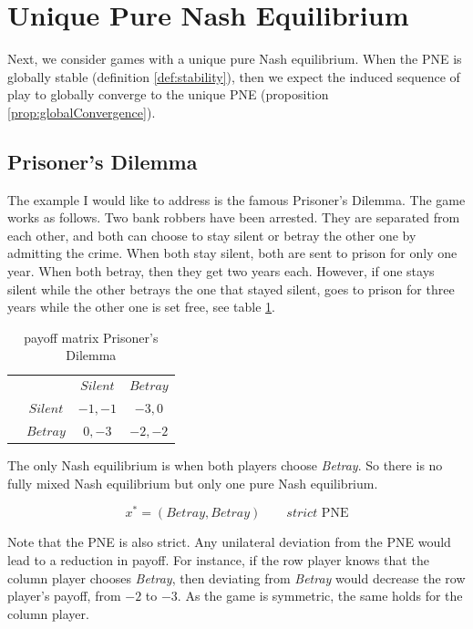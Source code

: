 \section{Unique Pure Nash Equilibrium}\label{section:uniquePureNashEquilibrium}

Next, we consider games with a unique pure Nash equilibrium. When the PNE is globally stable (definition \ref{def:stability}), then we expect the induced sequence of play to globally converge to the unique PNE (proposition \ref{prop:globalConvergence}). 

\subsection{Prisoner's Dilemma}\label{subsection:prisonersDilemma}

The example I would like to address is the famous Prisoner's Dilemma. The game works as follows. Two bank robbers have been arrested. They are separated from each other, and both can choose to stay silent or betray the other one by admitting the crime. When both stay silent, both are sent to prison for only one year. When both betray, then they get two years each. However, if one stays silent while the other betrays the one that stayed silent, goes to prison for three years while the other one is set free, see table \ref{tab:payoffPrisoners}.

\begin{table}[H]\centering
\setlength{\extrarowheight}{2pt}
\begin{tabular}{cc|c|c|}
  & \multicolumn{1}{c}{} & \multicolumn{1}{c}{$Silent$}  & \multicolumn{1}{c}{$Betray$} \\\cline{3-4}
  & $Silent$ & $-1,-1$ & $-3,0$ \\\cline{3-4}
  & $Betray$ & $0,-3$ & $-2,-2$ \\\cline{3-4}
\end{tabular}\caption{\label{tab:payoffPrisoners}payoff matrix Prisoner's Dilemma}
\end{table}

The only Nash equilibrium is when both players choose \textit{Betray}. So there is no fully mixed Nash equilibrium but only one pure Nash equilibrium. 

\begin{equation*}
    x^{*} = (Betray,Betray) \qquad \textit{strict }\text{PNE}
\end{equation*}

Note that the PNE is also strict. Any unilateral deviation from the PNE would lead to a reduction in payoff. For instance, if the row player knows that the column player  chooses \textit{Betray}, then deviating from \textit{Betray} would decrease the row player's payoff, from $-2$ to $-3$. As the game is symmetric, the same holds for the column player. \\


